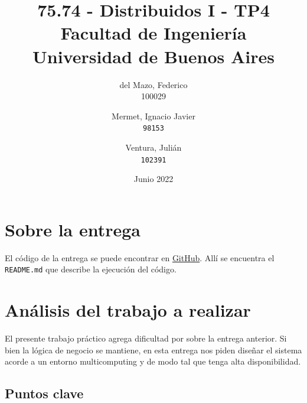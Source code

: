 \documentclass[titlepage,a4paper,oneside]{article}
\begin{document}
\begin{titlepage}
\title{
	75.74 \-- Distribuidos I \-- TP4\\
    \large Facultad de Ingeniería\\
	Universidad de Buenos Aires
}
\author{%
  del Mazo, Federico\\
  100029
\and
  Mermet, Ignacio Javier\\
  \texttt{98153}
\and
  Ventura, Julián\\
  \texttt{102391}
}


\date{Junio 2022}

\maketitle

\end{titlepage}

\tableofcontents

\newpage

\section{Sobre la entrega}

El código de la entrega se puede encontrar en \href{https://github.com/CrossNox/7574-TP3}{GitHub}.  Allí se encuentra el \texttt{README.md} que describe la ejecución del código.

\section{Análisis del trabajo a realizar}
El presente trabajo práctico agrega dificultad por sobre la entrega anterior. Si bien la lógica de negocio se mantiene, en esta entrega nos piden diseñar el sistema acorde a un entorno multicomputing y de modo tal que tenga alta disponibilidad.

\subsection{Puntos clave}
\end{document}
